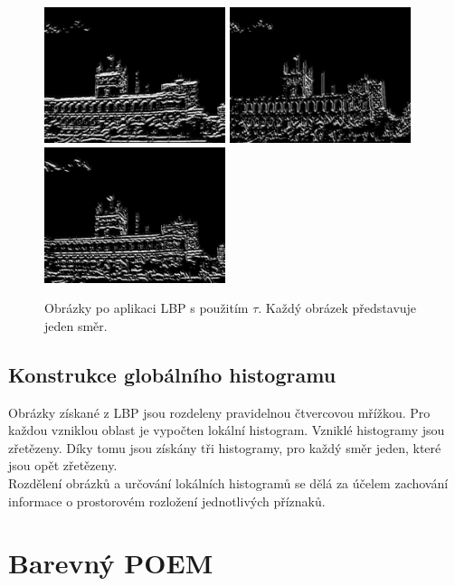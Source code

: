 \documentclass[czech,BP]{thesiskiv}
\begin{document}
\begin{figure}[ht]
	\centering
	\includegraphics[width=150pt]{./img/lbp1_tau.jpg}
	\includegraphics[width=150pt]{./img/lbp2_tau.jpg}
	\includegraphics[width=150pt]{./img/lbp3_tau.jpg}
	\caption{Obrázky po aplikaci LBP s použitím $\tau$. Každý obrázek představuje jeden směr.}
\end{figure}

\subsection{Konstrukce globálního histogramu}
\par Obrázky získané z LBP jsou rozdeleny pravidelnou čtvercovou mřížkou. Pro každou vzniklou oblast je vypočten lokální histogram. Vzniklé histogramy jsou zřetězeny. Díky tomu jsou získány tři histogramy, pro každý směr jeden, které jsou opět zřetězeny. \\
Rozdělení obrázků a určování lokálních histogramů se dělá za účelem zachování informace o prostorovém rozložení jednotlivých příznaků.

\section{Barevný POEM}
\end{document}
